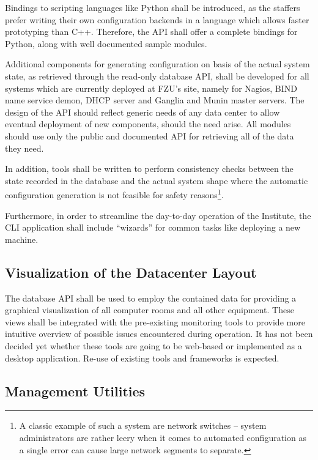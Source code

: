\documentclass{article}
\begin{document}
Bindings to scripting languages like Python shall be introduced, as the staffers prefer writing their own configuration backends
in a language which allows faster prototyping than C++.  Therefore, the API shall offer a complete bindings for Python, along with
well documented sample modules.

Additional components for generating configuration on basis of the actual system state, as retrieved through the read-only
database API, shall be developed for all systems which are currently deployed at FZU's site, namely for Nagios, BIND name service
demon, DHCP server and Ganglia and Munin master servers.  The design of the API should reflect generic needs of any data center to
allow eventual deployment of new components, should the need arise.  All modules should use only the public and documented API for
retrieving all of the data they need.

In addition, tools shall be written to perform consistency checks between the state recorded in the database and the actual system
shape where the automatic configuration generation is not feasible for safety reasons\footnote{A classic example of such a system
are network switches -- system administrators are rather leery when it comes to automated configuration as a single error can
cause large network segments to separate.}.

Furthermore, in order to streamline the day-to-day operation of the Institute, the CLI application shall include ``wizards'' for
common tasks like deploying a new machine.

\subsection{Visualization of the Datacenter Layout}

The database API shall be used to employ the contained data for providing a graphical visualization of all computer rooms and all
other equipment.  These views shall be integrated with the pre-existing monitoring tools to provide more intuitive overview of
possible issues encountered during operation.  It has not been decided yet whether these tools are going to be web-based or
implemented as a desktop application.  Re-use of existing tools and frameworks is expected.

\subsection{Management Utilities}
\end{document}
